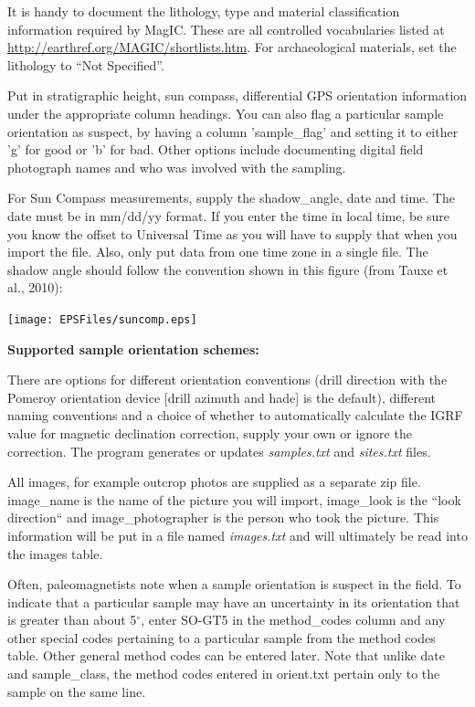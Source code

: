 \documentclass[11pt]{book}
\begin{document}
{{   It is handy  to document the lithology, type and material classification information required by MagIC. These  are all controlled vocabularies listed at \url{http://earthref.org/MAGIC/shortlists.htm}.   For archaeological materials, set the lithology to ``Not Specified''.

   Put in stratigraphic height, sun compass, differential GPS orientation information under the appropriate column headings.  You can also flag a particular sample orientation as suspect, by having a column 'sample\_flag' and setting it to either 'g' for good or 'b' for bad.  Other options include documenting digital field photograph names and who was involved with the sampling.

 For Sun Compass measurements, supply the shadow\_angle, date and time. The date must be in mm/dd/yy format. If you enter the time in local time, be sure you know the offset to Universal Time as you will have to supply that when you import the file. Also, only put data from one time zone in a single file. The shadow angle should follow the convention shown in this figure (from Tauxe et al., 2010): \nocite{tauxe10}

  \texttt{[image: EPSFiles/suncomp.eps]}


{\bf Supported sample orientation schemes:}

  There are options for
 different orientation conventions (drill direction with the Pomeroy orientation device  [drill azimuth and hade] is the default), different naming conventions and a choice of whether to automatically calculate the IGRF value for magnetic declination correction, supply your own or ignore the correction.  The program generates or updates {\it samples.txt} and {\it sites.txt} files.

 All images, for example outcrop photos are supplied as a separate zip file. image\_name is the name of the picture you will import, image\_look is the ``look direction`` and image\_photographer is the person who took the picture. This information will be put in a file named {\it images.txt} and will ultimately be read into the images table.

Often, paleomagnetists note when a sample orientation is suspect in the field. To indicate that a particular sample may have an uncertainty in its orientation that is greater than about 5$^{\circ}$, enter SO-GT5 in the method\_codes column and any other special codes pertaining to a particular sample from the method codes table. Other general method codes can be entered later. Note that unlike date and sample\_class, the method codes entered in orient.txt pertain only to the sample on the same line.

}}
\end{document}
